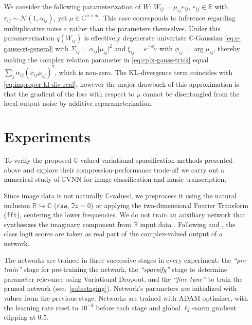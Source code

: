 \documentclass{article}
\newcommand{\real}{\mathbb{R}}
\newcommand{\cplx}{\mathbb{C}}
\newcommand{\iu}{{\jmath}}
\begin{document}
We consider the following parameterization of $W$: $
  W_{ij} = \mu_{ij} \varepsilon_{ij}
$, $\varepsilon_{ij} \in \real$ with $
  \varepsilon_{ij} \sim \mathcal{N}(1, \alpha_{ij})
$, yet $\mu \in \cplx^{n \times m}$. This case corresponds to inference regarding
multiplicative noise $\varepsilon$ rather than the parameters themselves. Under
this parameterization $q(W_{ij})$ is effectively degenerate univariate $\cplx$-Gaussian
\eqref{eq:c-gauss-vi-general} with $
  \Sigma_{ij} = \alpha_{ij} \lvert \mu_{ij} \rvert^2
$ and $
  \xi_{ij} = e^{\iu \phi_{ij}}
$ with $\phi_{ij} = \arg \mu_{ij}$, thereby making the complex relation parameter
in \eqref{eq:cplx-gauss-trick} equal $
  \sum_j \alpha_{ij} (x_{ij} \mu_{ij})^2
$, which is non-zero.
%
The KL-divergence term coincides with \eqref{eq:improper-kl-div-real}, however the major
drawback of this approximation is that the gradient of the loss with respect to $\mu$ cannot
be disentangled from the local output noise by additive reparameterization.





\section{Experiments} %
\label{sec:experiments}

To verify the proposed $\cplx$-valued variational sparsification methods presented
above and explore their compression-performance trade-off we carry out a numerical
study of $\cplx$VNN for image classification and music transcription.

Since image data is not naturally $\cplx$-valued, we preprocess it using the natural
inclusion $\real \hookrightarrow \cplx$ (\texttt{raw}, $\Im z = 0$) or applying the
two-dimensional Fourier Transform (\texttt{fft}), centering the lower frequencies. We
do not train an auxiliary network that synthesizes the imaginary component from $\real$
input data \citep{trabelsi_deep_2018}.
%
Following \citet{wolter_complex_2018} and \citet{trabelsi_deep_2018}, the class logit
scores are taken as real part of the complex-valued output of a network.

The networks are trained in three successive stages in every experiment: the \emph{``pre-train''}
stage for pre-training the network, the \emph{``sparsify''} stage to determine parameter
relevance using Variational Dropout, and the \emph{``fine-tune''} to train the pruned
network (sec.~\ref{sub:staging}). Network's parameters are initialized with values from
the previous stage.
%
Networks are trained with ADAM optimizer, with the learning rate reset to $10^{-3}$ before
each stage and global $\ell_2$-norm gradient clipping at $0.5$.
\end{document}
